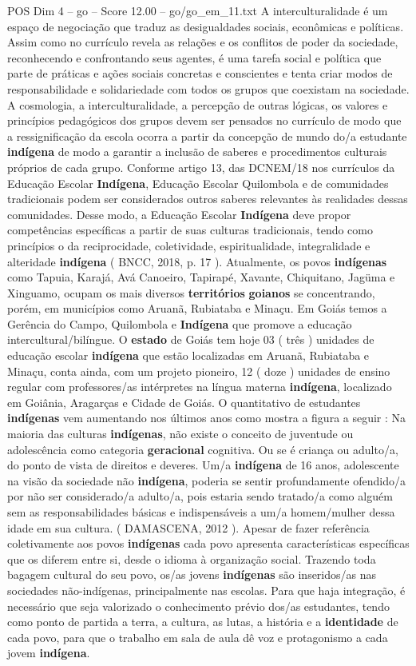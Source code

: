 \begin{textsample}{POS Dim 4 – go – Score 12.00 – go/go\_em\_11.txt}
A interculturalidade é um espaço de negociação que traduz as desigualdades sociais, econômicas e políticas.
Assim como no currículo revela as relações e os conflitos de poder da sociedade, reconhecendo e confrontando seus agentes, é uma tarefa social e política que parte de práticas e ações sociais concretas e conscientes e tenta criar modos de responsabilidade e solidariedade com todos os grupos que coexistam na sociedade.
A cosmologia, a interculturalidade, a percepção de outras lógicas, os valores e princípios pedagógicos dos grupos devem ser pensados no currículo de modo que a ressignificação da escola ocorra a partir da concepção de mundo do/a estudante \textbf{indígena} de modo a garantir a inclusão de saberes e procedimentos culturais próprios de cada grupo.
Conforme artigo 13, das DCNEM/18 nos currículos da Educação Escolar \textbf{Indígena}, Educação Escolar Quilombola e de comunidades tradicionais podem ser considerados outros saberes relevantes às realidades dessas comunidades.
Desse modo, a Educação Escolar \textbf{Indígena} deve propor competências específicas a partir de suas culturas tradicionais, tendo como princípios o da reciprocidade, coletividade, espiritualidade, integralidade e alteridade \textbf{indígena} ( BNCC, 2018, p. 17 ).
Atualmente, os povos \textbf{indígenas} como Tapuia, Karajá, Avá Canoeiro, Tapirapé, Xavante, Chiquitano, Jagüma e Xinguamo, ocupam os mais diversos \textbf{territórios} \textbf{goianos} se concentrando, porém, em municípios como Aruanã, Rubiataba e Minaçu.
Em Goiás temos a Gerência do Campo, Quilombola e \textbf{Indígena} que promove a educação intercultural/bilíngue.
O \textbf{estado} de Goiás tem hoje 03 ( três ) unidades de educação escolar \textbf{indígena} que estão localizadas em Aruanã, Rubiataba e Minaçu, conta ainda, com um projeto pioneiro, 12 ( doze ) unidades de ensino regular com professores/as intérpretes na língua materna \textbf{indígena}, localizado em Goiânia, Aragarças e Cidade de Goiás.
O quantitativo de estudantes \textbf{indígenas} vem aumentando nos últimos anos como mostra a figura a seguir : Na maioria das culturas \textbf{indígenas}, não existe o conceito de juventude ou adolescência como categoria \textbf{geracional} cognitiva.
Ou se é criança ou adulto/a, do ponto de vista de direitos e deveres.
Um/a \textbf{indígena} de 16 anos, adolescente na visão da sociedade não \textbf{indígena}, poderia se sentir profundamente ofendido/a por não ser considerado/a adulto/a, pois estaria sendo tratado/a como alguém sem as responsabilidades básicas e indispensáveis a um/a homem/mulher dessa idade em sua cultura. ( DAMASCENA, 2012 ).
Apesar de fazer referência coletivamente aos povos \textbf{indígenas} cada povo apresenta características específicas que os diferem entre si, desde o idioma à organização social.
Trazendo toda bagagem cultural do seu povo, os/as jovens \textbf{indígenas} são inseridos/as nas sociedades não-indígenas, principalmente nas escolas.
Para que haja integração, é necessário que seja valorizado o conhecimento prévio dos/as estudantes, tendo como ponto de partida a terra, a cultura, as lutas, a história e a \textbf{identidade} de cada povo, para que o trabalho em sala de aula dê voz e protagonismo a cada jovem \textbf{indígena}.


\end{textsample}
